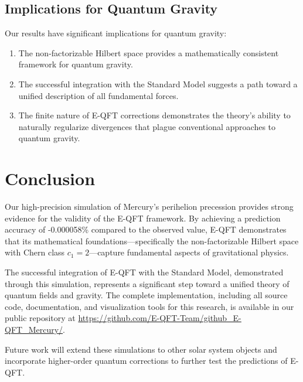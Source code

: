\documentclass[11pt]{article}
\theoremstyle{definition}
\begin{document}
\subsection{Implications for Quantum Gravity}

Our results have significant implications for quantum gravity:

\begin{enumerate}
	\item The non-factorizable Hilbert space provides a mathematically consistent framework for quantum gravity.
	
	\item The successful integration with the Standard Model suggests a path toward a unified description of all fundamental forces.
	
	\item The finite nature of E-QFT corrections demonstrates the theory's ability to naturally regularize divergences that plague conventional approaches to quantum gravity.
\end{enumerate}

\section{Conclusion}

Our high-precision simulation of Mercury's perihelion precession provides strong evidence for the validity of the E-QFT framework. By achieving a prediction accuracy of -0.000058\% compared to the observed value, E-QFT demonstrates that its mathematical foundations—specifically the non-factorizable Hilbert space with Chern class $c_1 = 2$—capture fundamental aspects of gravitational physics.

The successful integration of E-QFT with the Standard Model, demonstrated through this simulation, represents a significant step toward a unified theory of quantum fields and gravity. The complete implementation, including all source code, documentation, and visualization tools for this research, is available in our public repository at \url{https://github.com/E-QFT-Team/github_E-QFT_Mercury/}.

Future work will extend these simulations to other solar system objects and incorporate higher-order quantum corrections to further test the predictions of E-QFT.
\end{document}
